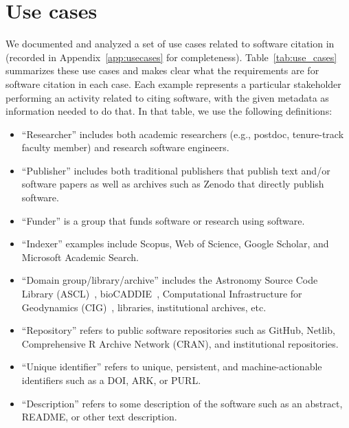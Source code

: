 \documentclass[12pt, oneside]{amsart}
\begin{document}
\section{Use cases}
\label{sec:use_cases}

We documented and analyzed a set of use cases related to software citation
in \cite{SC-Use-Cases} (recorded in Appendix~\ref{app:usecases} for completeness).
Table~\ref{tab:use_cases} summarizes these use cases and
makes clear what the requirements are for software citation in each case.
Each example represents a particular stakeholder performing an activity
related to citing software, with the given metadata as information needed to
do that. In that table, we use the following definitions:
\begin{itemize}

\item ``Researcher'' includes both academic researchers (e.g., postdoc,
tenure-track faculty member) and research software engineers.

\item ``Publisher'' includes both traditional publishers that publish text
and\slash or software papers as well as archives such as Zenodo that directly
publish software.

\item ``Funder'' is a group that funds software or research using software.

\item ``Indexer'' examples include Scopus, Web of Science, Google Scholar,
and Microsoft Academic Search.

\item ``Domain group\slash library\slash archive'' includes the Astronomy Source Code Library (ASCL)~\cite{ascl},
bioCADDIE~\cite{bioCADDIE}, Computational Infrastructure for Geodynamics (CIG)~\cite{CIG}, libraries, institutional archives, etc.

\item ``Repository'' refers to public software repositories such as GitHub, Netlib, Comprehensive R Archive
Network (CRAN), and institutional repositories.

\item ``Unique identifier'' refers to unique, persistent, and machine-actionable identifiers such as a DOI, ARK, or PURL.

\item ``Description'' refers to some description of the software such as an abstract, README, or other text description.


\end{itemize}
\end{document}
